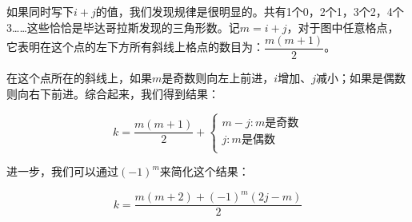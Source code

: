 \documentclass[b5paper]{ctexart}
\begin{document}
\begin{Answer}[ref={ex:algebraic}]
{如果同时写下$i+j$的值，我们发现规律是很明显的。共有1个0，2个1，3个2，4个3……这些恰恰是毕达哥拉斯发现的三角形数。记$m = i + j$，对于图中任意格点，它表明在这个点的左下方所有斜线上格点的数目为：$\dfrac{m(m + 1)}{2}$。

在这个点所在的斜线上，如果$m$是奇数则向左上前进，$i$增加、$j$减小；如果是偶数则向右下前进。综合起来，我们得到结果：

\[
k = \dfrac{m(m + 1)}{2} + \begin{cases} m - j: \text{$m$是奇数} \\
j: \text{$m$是偶数} \\
\end{cases}
\]

进一步，我们可以通过$(-1)^m$来简化这个结果：

\[
k = \dfrac{m(m + 2) + (-1)^m (2j - m)}{2}
\]
}
\end{Answer}
\end{document}
